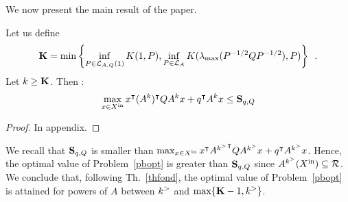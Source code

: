 \documentclass[10pt]{llncs}
\begin{document}

We now present the main result of the paper.
\begin{theorem}
\label{thfond}
Let us define \[\mathbf{K}=\min\left\{\inf_{P\in\mathcal{L}_{A,Q}(1)} K(1,P),\inf_{P\in\mathcal{L}_{A}} K(\lambda_{\operatorname{max}}(P^{-1/2}QP^{-1/2}),P)\right\}\enspace .\] Let $k\geq \mathbf{K}$. Then : 
\[
\max_{x\in X^\mathrm{in}} x^\intercal (A^k)^\intercal Q A^k x+q^\intercal A^k x\leq \mathbf{S}_{q,Q}
\]
\end{theorem}
\begin{proof}
In appendix.
\end{proof}
%
%
We recall that $\mathbf{S}_{q,Q}$ is smaller than $\max_{x\in X^\mathrm{in}} x^\intercal {A^{k^{>}}}^\intercal Q A^{k^{>}} x+q^\intercal A^{k^{>}} x$. Hence, the optimal value of Problem~\ref{pbopt} is greater than $\mathbf{S}_{q,Q}$ since $A^{k^{>}} (X^\mathrm{in})\subseteq \mathcal{R}$. We conclude that, following Th.~\ref{thfond}, the optimal value of Problem~\ref{pbopt} is attained for powers of $A$ between $k^{>}$  and $\max\{\mathbf{K}-1,k^{>}\}$.
\end{document}
